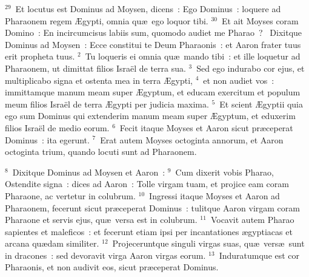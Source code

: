 ${}^{29}$~Et locutus est Dominus ad Moysen, dicens~: Ego Dominus~: loquere ad Pharaonem regem \AE gypti, omnia qu\ae\ ego loquor tibi.
${}^{30}$~Et ait Moyses coram Domino~: En incircumcisus labiis sum, quomodo audiet me Pharao~?
~\lettrine[lines=10,image=true,loversize=0.05,lraise=-0.03]{D}{}ixitque Dominus ad Moysen~: Ecce constitui te Deum Pharaonis~: et Aaron frater tuus erit propheta tuus.
${}^{2}$~Tu loqueris ei omnia qu\ae\ mando tibi~: et ille loquetur ad Pharaonem, ut dimittat filios Isra\"el de terra sua.
${}^{3}$~Sed ego indurabo cor ejus, et multiplicabo signa et ostenta mea in terra \AE gypti,
${}^{4}$~et non audiet vos~: immittamque manum meam super \AE gyptum, et educam exercitum et populum meum filios Isra\"el de terra \AE gypti per judicia maxima.
${}^{5}$~Et scient \AE gyptii quia ego sum Dominus qui extenderim manum meam super \AE gyptum, et eduxerim filios Isra\"el de medio eorum.
${}^{6}$~Fecit itaque Moyses et Aaron sicut pr\ae ceperat Dominus~: ita egerunt.
${}^{7}$~Erat autem Moyses octoginta annorum, et Aaron octoginta trium, quando locuti sunt ad Pharaonem.


${}^{8}$~Dixitque Dominus ad Moysen et Aaron~:
${}^{9}$~Cum dixerit vobis Pharao, Ostendite signa~: dices ad Aaron~: Tolle virgam tuam, et projice eam coram Pharaone, ac vertetur in colubrum.
${}^{10}$~Ingressi itaque Moyses et Aaron ad Pharaonem, fecerunt sicut pr\ae ceperat Dominus~: tulitque Aaron virgam coram Pharaone et servis ejus, qu\ae\ versa est in colubrum.
${}^{11}$~Vocavit autem Pharao sapientes et maleficos~: et fecerunt etiam ipsi per incantationes \ae gyptiacas et arcana qu\ae dam similiter.
${}^{12}$~Projeceruntque singuli virgas suas, qu\ae\ vers\ae\ sunt in dracones~: sed devoravit virga Aaron virgas eorum.
${}^{13}$~Induratumque est cor Pharaonis, et non audivit eos, sicut pr\ae ceperat Dominus.


